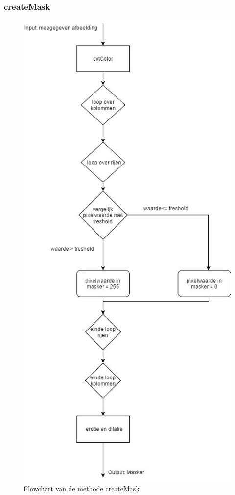 \subsubsection{createMask}
\begin{figure}[h]
	\includegraphics[scale=0.45]{FlowShart_createMask}
	\caption{Flowchart van de methode createMask}
	\label{imgFSCMa}
\end{figure}

